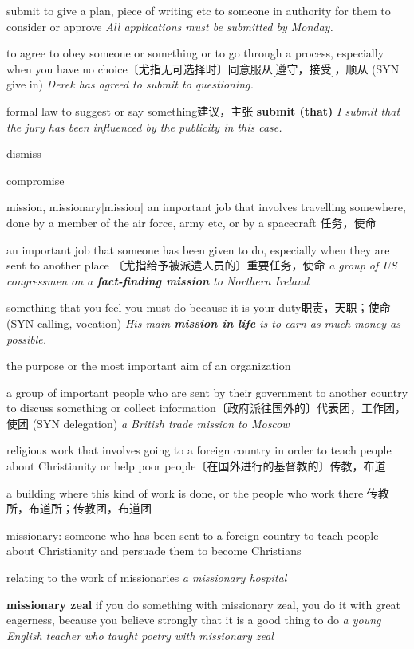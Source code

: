 \begin{DefWord}{submit}
    to give a plan, piece of writing etc to someone in authority for them to consider or approve
    \textit{All applications must be submitted by Monday.}

    to agree to obey someone or something or to go through a process, especially when you have no choice〔尤指无可选择时〕同意服从[遵守，接受]，顺从 (SYN  give in)
    \textit{Derek has agreed to submit to questioning.}

    formal law to suggest or say something建议，主张
    \textbf{submit (that)}
    \textit{I submit that the jury has been influenced by the publicity in this case.}
\end{DefWord}

\begin{DefWord}{dismiss}
\end{DefWord}

\begin{DefWord}{compromise}
\end{DefWord}

\begin{DefWord}{mission, missionary}[mission]
    an important job that involves travelling somewhere, done by a member of the air force, army etc, or by a spacecraft 任务，使命

    an important job that someone has been given to do, especially when they are sent to another place 〔尤指给予被派遣人员的〕重要任务，使命
    \textit{a group of US congressmen on a \textbf{fact-finding mission} to Northern Ireland}

    something that you feel you must do because it is your duty职责，天职；使命 (SYN  calling, vocation)
    \textit{His main \textbf{mission in life} is to earn as much money as possible.}

    the purpose or the most important aim of an organization

    a group of important people who are sent by their government to another country to discuss something or collect information〔政府派往国外的〕代表团，工作团，使团 (SYN  delegation)
    \textit{a British trade mission to Moscow}

    religious work that involves going to a foreign country in order to teach people about Christianity or help poor people〔在国外进行的基督教的〕传教，布道

    a building where this kind of work is done, or the people who work there 传教所，布道所；传教团，布道团

    missionary: someone who has been sent to a foreign country to teach people about Christianity and persuade them to become Christians

    relating to the work of missionaries
    \textit{a missionary hospital}

    \textbf{missionary zeal} if you do something with missionary zeal, you do it with great eagerness, because you believe strongly that it is a good thing to do
    \textit{a young English teacher who taught poetry with missionary zeal}
\end{DefWord}


